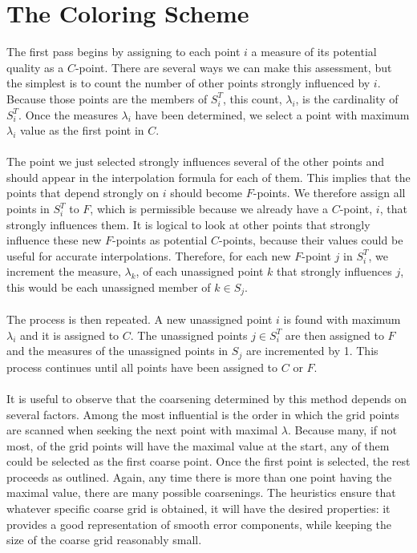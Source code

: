 \documentclass[11pt]{book}
\begin{document}
\section*{The Coloring Scheme}
The first pass begins by assigning to each point $i$ a measure of its potential quality as a $C$-point. There are several ways we can make this assessment, but the simplest is to count the number of other points strongly influenced by $i$. Because those points are the members of $S_{i}^{T}$, this count, $\lambda_{i}$, is the cardinality of $S_{i}^{T}$. Once the measures $\lambda_{i}$ have been determined, we select a point with maximum $\lambda_{i}$ value as the first point in $C$. \\ \\
The point we just selected strongly influences several of the other points and should appear in the interpolation formula for each of them. This implies that the points that depend strongly on $i$ should become $F$-points. We therefore assign all points in $S_{i}^{T}$ to $F$, which is permissible because we already have a $C$-point, $i$, that strongly influences them. It is logical to look at other points that strongly influence these new $F$-points as potential $C$-points, because their values could be useful for accurate interpolations. Therefore, for each new $F$-point $j$ in $S_{i}^{T}$, we increment the measure, $\lambda_{k}$, of each unassigned point $k$ that strongly influences $j$, this would be each unassigned member of $k \in S_{j}$.\\ \\
The process is then repeated. A new unassigned point $i$ is found with maximum $\lambda_{i}$ and it is assigned to $C$. The unassigned points $j \in S_{i}^{T}$ are then assigned to $F$ and the measures of the unassigned points in $S_{j}$ are incremented by 1. This process continues until all points have been assigned to $C$ or $F$. \\ \\
It is useful to observe that the coarsening determined by this method depends on several factors. Among the most influential is the order in which the grid points are scanned when seeking the next point with maximal $\lambda$. Because many, if not most, of the grid points will have the maximal value at the start, any of them could be selected as the first coarse point. Once the first point is selected, the rest proceeds as outlined. Again, any time there is more than one point having the maximal value, there are many possible coarsenings. The heuristics ensure that whatever specific coarse grid is obtained, it will have the desired properties: it provides a good representation of smooth error components, while keeping the size of the coarse grid reasonably small.
\end{document}
